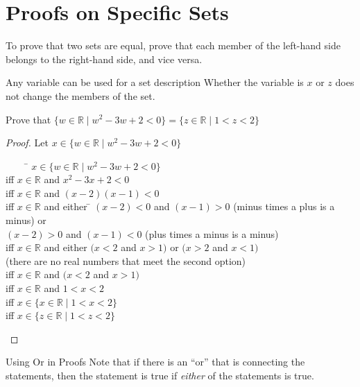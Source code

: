 \documentclass[\main/notes.tex]{subfiles}
\begin{document}
		\section{Proofs on Specific Sets}
			To prove that two sets are equal, prove that each member of the left-hand side belongs to the right-hand side, and vice versa.
			\begin{sidenote}{Any variable can be used for a set description}
				Whether the variable is $x$ or $z$ does not change the members of the set.
			\end{sidenote}
			\begin{example}
				Prove that $\{w \in \mathbb{R} \mid w^{2} - 3w + 2 < 0\} = \{z \in \mathbb{R} \mid 1 < z < 2\}$
				\begin{proof}
					Let $x \in \{w \in \mathbb{R} \mid w^{2} - 3w + 2 < 0\}$
					\begin{tabbing}
						$\qquad$ \= $x \in \{w \in \mathbb{R} \mid w^{2} - 3w + 2 < 0\}$\\
						iff      \> $x \in \mathbb{R}$ and $x^{2} - 3x + 2 < 0$\\
						iff      \> $x \in \mathbb{R}$ and $(x - 2)(x - 1) < 0$\\
						iff      \> $x \in \mathbb{R}$ and either \= $(x - 2) < 0$ and $(x - 1) > 0$ (minus times a plus is a minus) or\\
						         \>                               \> $(x - 2) > 0$ and $(x - 1) < 0$ (plus times a minus is a minus)\\
						iff      \> $x \in \mathbb{R}$ and either \> $(x < 2$ and $x > 1)$ or $(x > 2$ and $x < 1)$\\
										 \>                               \> (there are no real numbers that meet the second option)\\
						iff      \> $x \in \mathbb{R}$ and $(x < 2$ and $x > 1)$\\
						iff      \> $x \in \mathbb{R}$ and $1 < x < 2$\\
						iff      \> $x \in \{x \in \mathbb{R} \mid 1 < x < 2\}$\\
						iff      \> $x \in \{z \in \mathbb{R} \mid 1 < z < 2\}$
					\end{tabbing}
				\end{proof}
			\end{example}
			\begin{sidenote}{Using Or in Proofs}
				Note that if there is an ``or'' that is connecting the statements, then the statement is true if \emph{either} of the statements is true.
			\end{sidenote}
\end{document}
